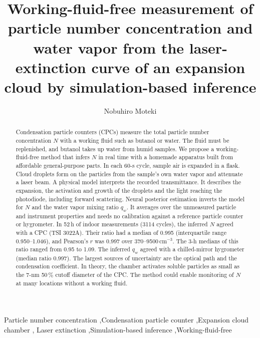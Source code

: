 \documentclass[preprint,review,12pt,authoryear]{elsarticle}
\begin{document}
\begin{frontmatter}

\title{Working-fluid-free measurement of particle number concentration and water vapor from the
laser-extinction curve of an expansion cloud by simulation-based inference}

\author[tmu]{Nobuhiro Moteki}

\begin{abstract}
Condensation particle counters (CPCs) measure the total particle number concentration $N$ with a
working fluid such as butanol or water. The fluid must be replenished, and butanol takes up water from humid
samples. We propose a working-fluid-free method that infers $N$ in real time with a homemade
apparatus built from affordable general-purpose parts. In each 60-s cycle, sample air is expanded in a
flask. Cloud droplets form on the particles from the sample's own water vapor and attenuate a laser beam. A
physical model interprets the recorded transmittance. It describes the expansion, the activation and growth
of the droplets and the light reaching the photodiode, including
forward scattering. Neural posterior estimation inverts the model for $N$ and the water vapor mixing
ratio $q_w$. It averages over the unmeasured particle and instrument properties and needs no
calibration against a reference particle counter or hygrometer. In 52\,h of indoor measurements
(3114 cycles), the inferred $N$ agreed with a CPC (TSI 3022A). Their ratio had a median of 0.995
(interquartile range 0.950--1.046), and Pearson's $r$ was 0.997 over 370--9500\,cm$^{-3}$. The 3-h
medians of this ratio ranged from 0.95 to 1.09. The inferred $q_w$ agreed with a chilled-mirror hygrometer
(median ratio 0.997). The largest sources of uncertainty are the optical path and the
condensation coefficient. In theory, the chamber activates soluble particles as small as the 7-nm 50\,\%
cutoff diameter of the CPC. The method could enable monitoring of $N$ at many locations without a
working fluid.
\end{abstract}

\begin{keyword}
Particle number concentration \sep Condensation particle counter \sep Expansion cloud chamber \sep
Laser extinction \sep Simulation-based inference \sep Working-fluid-free
\end{keyword}

\end{frontmatter}
\linenumbers
\end{document}
